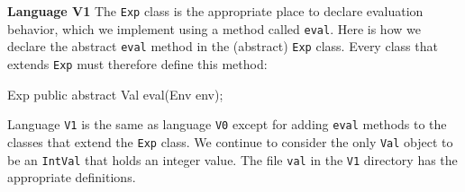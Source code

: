 \begin{minipage}[t]{\sw}
\slidenumber
\LARGE
{\bf Language V1}\exx
The \verb'Exp' class is the appropriate place
to declare evaluation behavior,
which we implement using a method called \verb'eval'.
Here is how we declare the abstract \verb'eval' method
in the (abstract) \verb'Exp' class.
Every class that extends \verb'Exp' must therefore define this method:
\begin{qv}
Exp
    public abstract Val eval(Env env);
\end{qv}
Language \verb'V1' is the same as language \verb'V0'
except for adding \verb'eval' methods
to the classes that extend the \verb'Exp' class.
We continue to consider the only \verb'Val' object
to be an \verb'IntVal' that holds an integer value.
The file \verb'val' in the \verb'V1' directory
has the appropriate definitions.\exx
\end{minipage}
